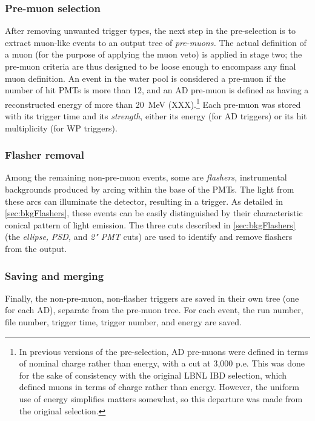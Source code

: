 \documentclass[../thesis.tex]{subfiles}
\begin{document}
\subsubsection{Pre-muon selection}
\label{sec:selPreMuons}

After removing unwanted trigger types, the next step in the pre-selection is to extract muon-like events to an output tree of \emph{pre-muons.} The actual definition of a muon (for the purpose of applying the muon veto) is applied in stage two; the pre-muon criteria are thus designed to be loose enough to encompass any final muon definition. An event in the water pool is considered a pre-muon if the number of hit PMTs is more than 12, and an AD pre-muon is defined as having a reconstructed energy of more than 20~MeV (XXX).\footnote{In previous versions of the pre-selection, AD pre-muons were defined in terms of nominal charge rather than energy, with a cut at 3,000 p.e. This was done for the sake of consistency with the original LBNL IBD selection, which defined muons in terms of charge rather than energy. However, the uniform use of energy simplifies matters somewhat, so this departure was made from the original selection.} Each pre-muon was stored with its trigger time and its \emph{strength}, either its energy (for AD triggers) or its hit multiplicity (for WP triggers).

\subsubsection{Flasher removal}
\label{sec:selFlashers}

Among the remaining non-pre-muon events, some are \emph{flashers,} instrumental backgrounds produced by arcing within the base of the PMTs. The light from these arcs can illuminate the detector, resulting in a trigger. As detailed in \autoref{sec:bkgFlashers}, these events can be easily distinguished by their characteristic conical pattern of light emission. The three cuts described in \autoref{sec:bkgFlashers} (the \emph{ellipse,} \emph{PSD,} and \emph{2" PMT} cuts) are used to identify and remove flashers from the output.

\subsubsection{Saving and merging}
\label{sec:selMergingOne}

Finally, the non-pre-muon, non-flasher triggers are saved in their own tree (one for each AD), separate from the pre-muon tree. For each event, the run number, file number, trigger time, trigger number, and energy are saved.
\end{document}
